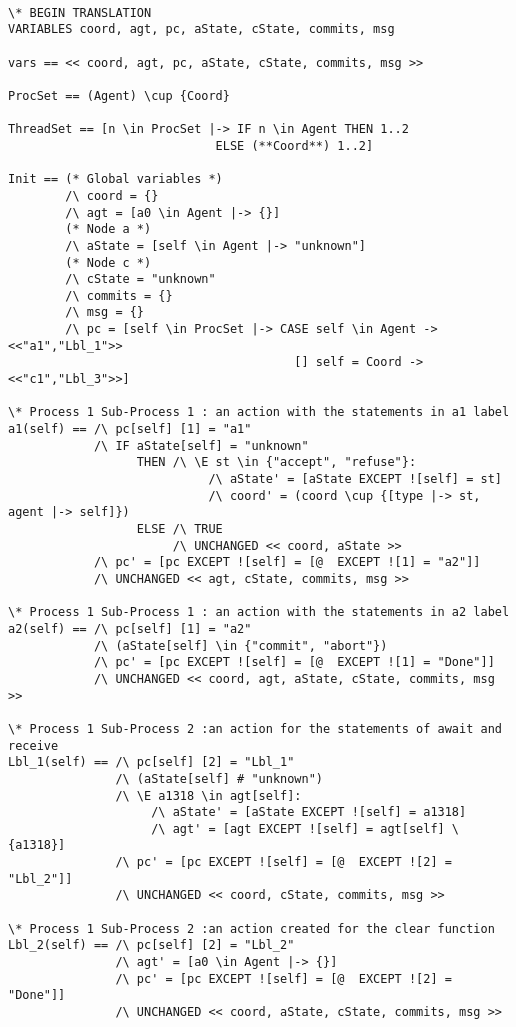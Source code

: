 \documentclass{thesul}
\begin{document}
\begin{lstlisting}[caption = TLA+ translation for Sub-Processes, frame = tlrb, firstnumber = 1]

\* BEGIN TRANSLATION
VARIABLES coord, agt, pc, aState, cState, commits, msg

vars == << coord, agt, pc, aState, cState, commits, msg >>

ProcSet == (Agent) \cup {Coord}

ThreadSet == [n \in ProcSet |-> IF n \in Agent THEN 1..2
                             ELSE (**Coord**) 1..2]

Init == (* Global variables *)
        /\ coord = {}
        /\ agt = [a0 \in Agent |-> {}]
        (* Node a *)
        /\ aState = [self \in Agent |-> "unknown"]
        (* Node c *)
        /\ cState = "unknown"
        /\ commits = {}
        /\ msg = {}
        /\ pc = [self \in ProcSet |-> CASE self \in Agent -> <<"a1","Lbl_1">>
                                        [] self = Coord -> <<"c1","Lbl_3">>]

\* Process 1 Sub-Process 1 : an action with the statements in a1 label
a1(self) == /\ pc[self] [1] = "a1"
            /\ IF aState[self] = "unknown"
                  THEN /\ \E st \in {"accept", "refuse"}:
                            /\ aState' = [aState EXCEPT ![self] = st]
                            /\ coord' = (coord \cup {[type |-> st, agent |-> self]})
                  ELSE /\ TRUE
                       /\ UNCHANGED << coord, aState >>
            /\ pc' = [pc EXCEPT ![self] = [@  EXCEPT ![1] = "a2"]]
            /\ UNCHANGED << agt, cState, commits, msg >>

\* Process 1 Sub-Process 1 : an action with the statements in a2 label
a2(self) == /\ pc[self] [1] = "a2"
            /\ (aState[self] \in {"commit", "abort"})
            /\ pc' = [pc EXCEPT ![self] = [@  EXCEPT ![1] = "Done"]]
            /\ UNCHANGED << coord, agt, aState, cState, commits, msg >>

\* Process 1 Sub-Process 2 :an action for the statements of await and receive
Lbl_1(self) == /\ pc[self] [2] = "Lbl_1"
               /\ (aState[self] # "unknown")
               /\ \E a1318 \in agt[self]:
                    /\ aState' = [aState EXCEPT ![self] = a1318]
                    /\ agt' = [agt EXCEPT ![self] = agt[self] \ {a1318}]
               /\ pc' = [pc EXCEPT ![self] = [@  EXCEPT ![2] = "Lbl_2"]]
               /\ UNCHANGED << coord, cState, commits, msg >>

\* Process 1 Sub-Process 2 :an action created for the clear function
Lbl_2(self) == /\ pc[self] [2] = "Lbl_2"
               /\ agt' = [a0 \in Agent |-> {}]
               /\ pc' = [pc EXCEPT ![self] = [@  EXCEPT ![2] = "Done"]]
               /\ UNCHANGED << coord, aState, cState, commits, msg >>


\end{lstlisting}
\end{document}
